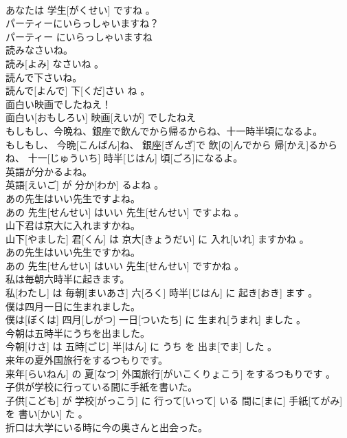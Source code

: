 \documentclass[8pt]{extreport}
\begin{document}
\begin{CJK}{UTF8}{min}
\\	あなたは 学生[がくせい] ですね 。
\\	パーティーにいらっしゃいますね？	
\\	パーティー にいらっしゃいますね 
\\	読みなさいね。	
\\	読み[よみ] なさいね 。
\\	読んで下さいね。	
\\	読んで[よんで] 下[くだ]さい ね 。
\\	面白い映画でしたねえ！	
\\	面白い[おもしろい] 映画[えいが] でしたねえ 
\\	もしもし、今晩ね、銀座で飲んでから帰るからね、十一時半頃になるよ。	
\\	もしもし、 今晩[こんばん]ね、 銀座[ぎんざ]で 飲[の]んでから 帰[かえ]るからね、 十一[じゅういち] 時半[じはん] 頃[ごろ]になるよ。
\\	英語が分かるよね。	
\\	英語[えいご] が 分か[わか] るよね 。
\\	あの先生はいい先生ですよね。	
\\	あの 先生[せんせい] はいい 先生[せんせい] ですよね 。
\\	山下君は京大に入れますかね。	
\\	山下[やました] 君[くん] は 京大[きょうだい] に 入れ[いれ] ますかね 。
\\	あの先生はいい先生ですかね。	
\\	あの 先生[せんせい] はいい 先生[せんせい] ですかね 。
\\	私は毎朝六時半に起きます。	
\\	私[わたし] は 毎朝[まいあさ] 六[ろく] 時半[じはん] に 起き[おき] ます 。
\\	僕は四月一日に生まれました。	
\\	僕は[ぼくは] 四月[しがつ] 一日[ついたち] に 生まれ[うまれ] ました 。
\\	今朝は五時半にうちを出ました。	
\\	今朝[けさ] は 五時[ごじ] 半[はん] に うち を 出ま[でま] した 。
\\	来年の夏外国旅行をするつもりです。	
\\	来年[らいねん] の 夏[なつ] 外国旅行[がいこくりょこう] をするつもりです 。
\\	子供が学校に行っている間に手紙を書いた。	
\\	子供[こども] が 学校[がっこう] に 行って[いって] いる 間に[まに] 手紙[てがみ] を 書い[かい] た 。
\\	折口は大学にいる時に今の奥さんと出会った。	

\end{CJK}
\end{document}
